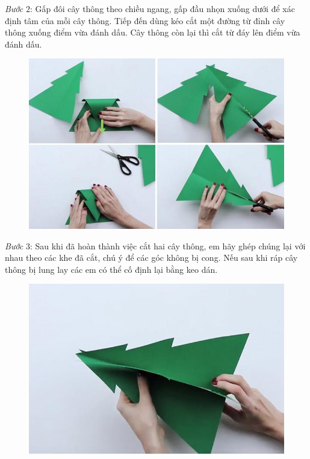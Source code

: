\begin{multicols}{2}
\begin{figure}[H]
		\vspace*{-15pt}
	\end{figure}
	\textit{Bước} $2$: Gấp đôi cây thông theo chiều ngang, gấp đầu nhọn xuống dưới để xác định tâm của mỗi cây thông. Tiếp đến dùng kéo cắt một đường từ đỉnh cây thông xuống điểm vừa đánh dấu. Cây thông còn lại thì cắt từ đáy lên điểm vừa đánh dấu.
	\begin{figure}[H]
		\vspace*{-5pt}
		\centering
		\captionsetup{labelformat= empty, justification=centering}
		\includegraphics[width= 1\linewidth]{7}
		\vspace*{-15pt}
	\end{figure}
	\textit{Bước} $3$: Sau khi đã hoàn thành việc cắt hai cây thông, em hãy ghép chúng lại với nhau theo các khe đã cắt, chú ý để các góc không bị cong. Nếu sau khi ráp cây thông bị lung lay các em có thể cố định lại bằng keo dán.
	\begin{figure}[H]
		\vspace*{-5pt}
		\centering
		\captionsetup{labelformat= empty, justification=centering}
		\includegraphics[width= 1\linewidth]{8}

\end{figure}
\end{multicols}
